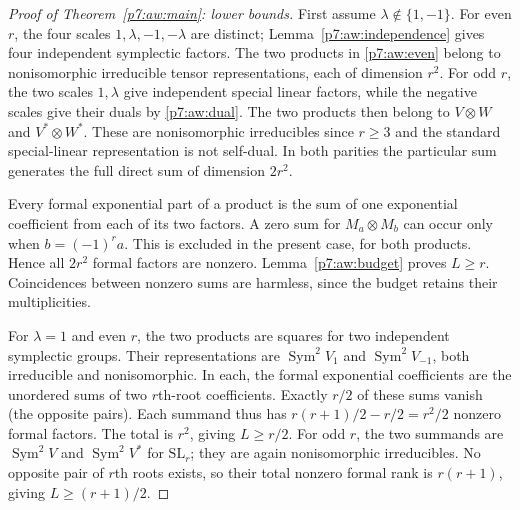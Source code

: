 \documentclass[11pt,a4paper]{article}
\theoremstyle{definition}
\theoremstyle{remark}
\numberwithin{equation}{section}
\begin{document}
\begin{proof}[Proof of Theorem~\ref{p7:aw:main}: lower bounds]
First assume $\lambda\notin\{1,-1\}$.
For even $r$, the four scales $1,\lambda,-1,-\lambda$ are distinct;
Lemma~\ref{p7:aw:independence} gives four independent symplectic factors.
The two products in \eqref{p7:aw:even} belong to nonisomorphic
irreducible tensor representations, each of dimension $r^2$.
For odd $r$, the two scales $1,\lambda$ give independent special
linear factors, while the negative scales give their duals by
\eqref{p7:aw:dual}. The two products then belong to
$V\otimes W$ and $V^*\otimes W^*$. These are nonisomorphic
irreducibles since $r\ge3$ and the standard special-linear
representation is not self-dual. In both parities the particular
sum generates the full direct sum of dimension $2r^2$.

Every formal exponential part of a product is the sum of one
exponential coefficient from each of its two factors. A zero sum
for $M_a\otimes M_b$ can occur only when $b=(-1)^r a$.
This is excluded in the present case, for both products. Hence all
$2r^2$ formal factors are nonzero. Lemma~\ref{p7:aw:budget} proves
$L\ge r$. Coincidences between nonzero sums are harmless, since
the budget retains their multiplicities.

For $\lambda=1$ and even $r$, the two products are squares for two
independent symplectic groups. Their representations are
$\operatorname{Sym}^2V_1$ and $\operatorname{Sym}^2V_{-1}$,
both irreducible and nonisomorphic. In each, the formal exponential
coefficients are the unordered sums of two $r$th-root coefficients.
Exactly $r/2$ of these sums vanish (the opposite pairs). Each
summand thus has $r(r+1)/2-r/2=r^2/2$ nonzero formal factors.
The total is $r^2$, giving $L\ge r/2$.
For odd $r$, the two summands are $\operatorname{Sym}^2V$ and
$\operatorname{Sym}^2V^*$ for $\mathrm{SL}_r$; they are again
nonisomorphic irreducibles. No opposite pair of $r$th roots exists,
so their total nonzero formal rank is $r(r+1)$, giving
$L\ge(r+1)/2$.


\end{proof}
\end{document}

